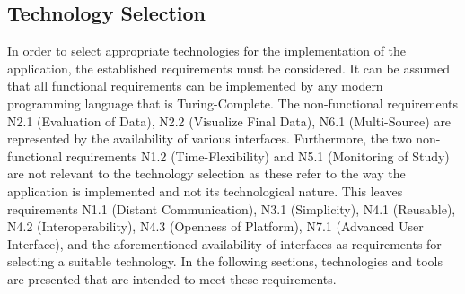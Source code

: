 \subsection{Technology Selection}

In order to select appropriate technologies for the implementation of the application, the established requirements must be considered. It can be assumed that all functional requirements can be implemented by any modern programming language that is Turing-Complete. The non-functional requirements N2.1 (Evaluation of Data), N2.2 (Visualize Final Data), N6.1 (Multi-Source) are represented by the availability of various interfaces. Furthermore, the two non-functional requirements N1.2 (Time-Flexibility) and N5.1 (Monitoring of Study) are not relevant to the technology selection as these refer to the way the application is implemented and not its technological nature. This leaves requirements N1.1 (Distant Communication), N3.1 (Simplicity), N4.1 (Reusable), N4.2 (Interoperability), N4.3 (Openness of Platform), N7.1 (Advanced User Interface), and the aforementioned availability of interfaces as requirements for selecting a suitable technology. In the following sections, technologies and tools are presented that are intended to meet these requirements.



